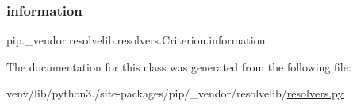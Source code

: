 \mbox{\label{classpip_1_1__vendor_1_1resolvelib_1_1resolvers_1_1Criterion_a91c2ba5379d097de54c71ad0791f48cb}} 
\subsubsection{\texorpdfstring{information}{information}}
{\footnotesize\ttfamily pip.\+\_\+vendor.\+resolvelib.\+resolvers.\+Criterion.\+information}



The documentation for this class was generated from the following file\+:\begin{DoxyCompactItemize}
\item 
venv/lib/python3./site-\/packages/pip/\+\_\+vendor/resolvelib/\hyperlink{resolvers_8py}{resolvers.\+py}\end{DoxyCompactItemize}
